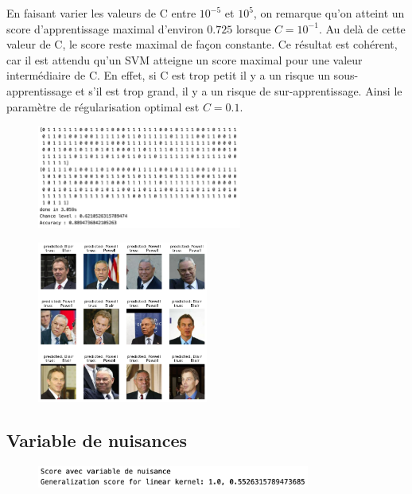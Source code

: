 \documentclass[a4paper,12pt]{article}
\begin{document}
En faisant varier les valeurs de C entre $10^{-5}$ et $10^{5}$, on remarque qu'on atteint un score d'apprentissage maximal d'environ $0.725$ lorsque $C=10^{-1}$.
Au delà de cette valeur de C, le score reste maximal de façon constante.
Ce résultat est cohérent, car il est attendu qu’un SVM atteigne un score maximal pour une valeur intermédiaire de 
C. En effet, si C est trop petit il y a un risque un sous-apprentissage et s'il est trop grand, il y a un risque de sur-apprentissage.
Ainsi le paramètre de régularisation optimal est $C=0.1$.


\begin{figure}[H]    
        \centering    
        \includegraphics[width=0.6\textwidth]{Images/label_prediction.png}
        \caption{}
\end{figure}

\begin{figure}[H]
    \centering
    \includegraphics[width=0.5\textwidth]{Images/prediction_visage.png}
    \caption{}
\end{figure}

\subsection{Variable de nuisances}

\begin{figure}[H]
    \centering
    \includegraphics[width=0.8\textwidth]{Images/avec_variable.png}
    \caption{}
    \label{fig:}
\end{figure}
\end{document}
